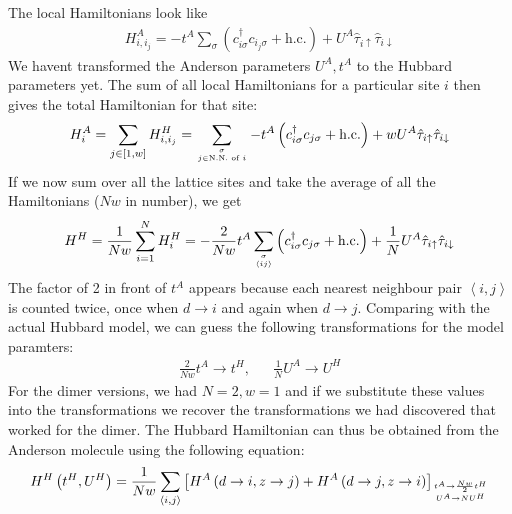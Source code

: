 \documentclass[12pt]{article}
\numberwithin{equation}{section}
\begin{document}
The local Hamiltonians look like
\begin{equation}\begin{aligned}
	H^A_{i,i_j} = -t^A\sum_{\sigma}\left(c^\dagger_{i\sigma}c_{i_j\sigma} + \text{h.c.}\right) + U^A\hat \tau_{i \uparrow}\hat \tau_{i \downarrow}
\end{aligned}\end{equation}
We havent transformed the Anderson parameters \(U^A, t^A\) to the Hubbard parameters yet. The sum of all local Hamiltonians for a particular site \(i\) then gives the total Hamiltonian for that site:
\begin{equation}\begin{aligned}
	H^A_{i} = \sum_{j\in\left[1,w\right]}H^H_{i,i_j} = \sum_{\sigma\atop{j \in \text{N.N. of }i}}-t^A\left(c^\dagger_{i\sigma}c_{j\sigma} + \text{h.c.}\right) + w U^A\hat \tau_{i \uparrow}\hat \tau_{i \downarrow}
\end{aligned}\end{equation}
If we now sum over all the lattice sites and take the average of all the Hamiltonians (\(Nw\) in number), we get
\begin{equation}\begin{aligned}
	H^H = \frac{1}{Nw}\sum_{i=1}^N H^H_{i} = -\frac{2}{Nw}t^A\sum_{\sigma\atop{\left<ij \right>}}\left(c^\dagger_{i\sigma}c_{j\sigma} + \text{h.c.}\right) + \frac{1}{N}U^A\hat \tau_{i \uparrow}\hat \tau_{i \downarrow}
\end{aligned}\end{equation}
The factor of 2 in front of \(t^A\) appears because each nearest neighbour pair \(\left<i,j \right>\) is counted twice, once when \(d\to i\) and again when \(d \to j\). Comparing with the actual Hubbard model, we can guess the following transformations for the model paramters:
\begin{equation}\begin{aligned}
	\frac{2}{Nw}t^A \to t^H, && \frac{1}{N}U^A \to U^H
\end{aligned}\end{equation}
For the dimer versions, we had \(N=2, w=1\) and if we substitute these values into the transformations we recover the transformations we had discovered that worked for the dimer. The Hubbard Hamiltonian can thus be obtained from the Anderson molecule using the following equation:
\begin{equation}\begin{aligned}
	H^H\left(t^H, U^H\right)  = \frac{1}{Nw}\sum_{\left<i,j\right>}\left[H^A\left(d \to i, z \to j\right) + H^A\left(d \to j, z \to i\right)\right]_{t^A \to \frac{Nw}{2}t^H \atop{U^A \to N U^H}}
\end{aligned}\end{equation}
\end{document}
